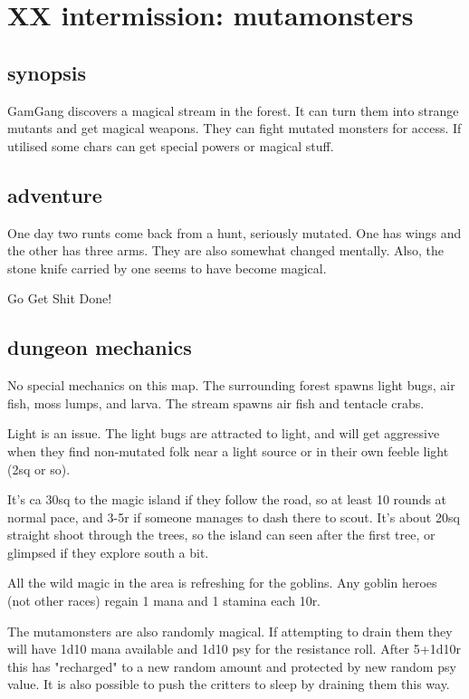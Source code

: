 \section*{XX intermission: mutamonsters}


\subsection*{synopsis}

GamGang discovers a magical stream in the forest. It can turn them into strange mutants and get magical weapons. They can fight mutated monsters for access. If utilised some chars can get special powers or magical stuff.


\subsection*{adventure}

One day two runts come back from a hunt, seriously mutated. One has wings and the other has three arms. They are also somewhat changed mentally. Also, the stone knife carried by one seems to have become magical.

\begin{readoutloud}
Go Get Shit Done!
\end{readoutloud}


\subsection*{dungeon mechanics}

No special mechanics on this map. The surrounding forest spawns light bugs, air fish, moss lumps, and larva. The stream spawns air fish and tentacle crabs.

Light is an issue. The light bugs are attracted to light, and will get aggressive when they find non-mutated folk near a light source or in their own feeble light (2sq or so).

It's ca 30sq to the magic island if they follow the road, so at least 10 rounds at normal pace, and 3-5r if someone manages to dash there to scout. It's about 20sq straight shoot through the trees, so the island can seen after the first tree, or glimpsed if they explore south a bit.

All the wild magic in the area is refreshing for the goblins. Any goblin heroes (not other races) regain 1 mana and 1 stamina each 10r.

The mutamonsters are also randomly magical. If attempting to drain them they will have 1d10 mana available and 1d10 psy for the resistance roll. After 5+1d10r this has "recharged" to a new random amount and protected by new random psy value. It is also possible to push the critters to sleep by draining them this way.


